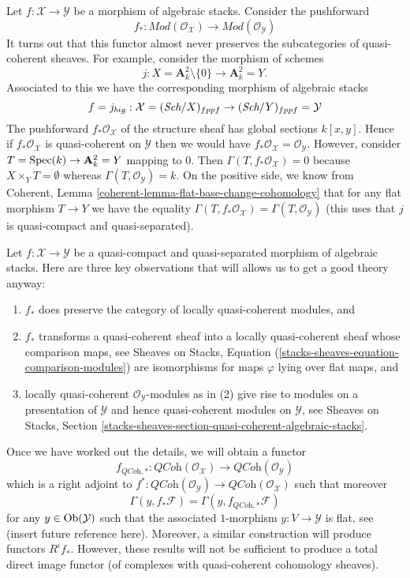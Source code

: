 \noindent
Let $f : \mathcal{X} \to \mathcal{Y}$ be a morphism of algebraic stacks.
Consider the pushforward
$$
f_* :
\textit{Mod}(\mathcal{O}_\mathcal{X})
\longrightarrow
\textit{Mod}(\mathcal{O}_\mathcal{Y})
$$
It turns out that this functor almost never preserves the subcategories
of quasi-coherent sheaves. For example, consider the morphism of schemes
$$
j : X = \mathbf{A}^2_k \setminus \{0\} \longrightarrow \mathbf{A}^2_k = Y.
$$
Associated to this we have the corresponding morphism of algebraic stacks
$$
f = j_{big} : \mathcal{X} = (\textit{Sch}/X)_{fppf} \to
(\textit{Sch}/Y)_{fppf} = \mathcal{Y}
$$
The pushforward $f_*\mathcal{O}_\mathcal{X}$ of the structure sheaf has
global sections $k[x, y]$. Hence if $f_*\mathcal{O}_\mathcal{X}$ is
quasi-coherent on $\mathcal{Y}$ then we would have
$f_*\mathcal{O}_\mathcal{X} = \mathcal{O}_\mathcal{Y}$. However,
consider $T = \mathop{\rm Spec}(k) \to \mathbf{A}^2_k = Y$ mapping to $0$.
Then $\Gamma(T, f_*\mathcal{O}_\mathcal{X}) = 0$ because
$X \times_Y T = \emptyset$ whereas $\Gamma(T, \mathcal{O}_\mathcal{Y}) = k$.
On the positive side, we know from
Coherent, Lemma \ref{coherent-lemma-flat-base-change-cohomology}
that for any flat morphism $T \to Y$ we have the equality
$\Gamma(T, f_*\mathcal{O}_\mathcal{X}) = \Gamma(T, \mathcal{O}_\mathcal{Y})$
(this uses that $j$ is quasi-compact and quasi-separated).

\medskip\noindent
Let $f : \mathcal{X} \to \mathcal{Y}$ be a quasi-compact and
quasi-separated morphism of algebraic stacks. Here are
three key observations that will allows us to get a good theory anyway:
\begin{enumerate}
\item $f_*$ does preserve the category of locally quasi-coherent modules, and
\item $f_*$ transforms a quasi-coherent sheaf into a locally quasi-coherent
sheaf whose comparison maps, see
Sheaves on Stacks, Equation (\ref{stacks-sheaves-equation-comparison-modules})
are isomorphisms for maps $\varphi$ lying over flat maps, and
\item locally quasi-coherent $\mathcal{O}_\mathcal{Y}$-modules as in (2)
give rise to modules on a presentation of $\mathcal{Y}$ and hence
quasi-coherent modules on $\mathcal{Y}$, see
Sheaves on Stacks, Section
\ref{stacks-sheaves-section-quasi-coherent-algebraic-stacks}.
\end{enumerate}
Once we have worked out the details, we will obtain a functor
$$
f_{\textit{QCoh}, *} :
\textit{QCoh}(\mathcal{O}_\mathcal{X})
\longrightarrow
\textit{QCoh}(\mathcal{O}_\mathcal{Y})
$$
which is a right adjoint to
$f^* : \textit{QCoh}(\mathcal{O}_\mathcal{Y}) \to
\textit{QCoh}(\mathcal{O}_\mathcal{X})$
such that moreover
$$
\Gamma(y, f_*\mathcal{F}) = \Gamma(y, f_{\textit{QCoh}, *}\mathcal{F})
$$
for any $y \in \mathop{\rm Ob}\nolimits(\mathcal{Y})$ such that the associated
$1$-morphism $y : V \to \mathcal{Y}$ is flat, see (insert future
reference here).
Moreover, a similar construction will produce functors $R^if_*$.
However, these results will not be sufficient to produce a
total direct image functor (of complexes with quasi-coherent
cohomology sheaves).







